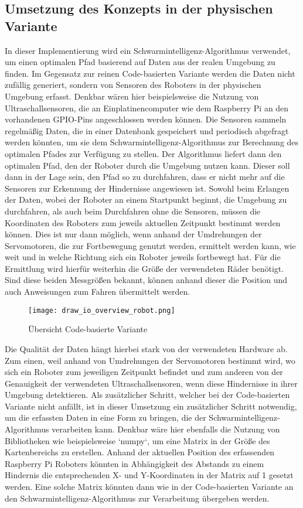 \subsection{Umsetzung des Konzepts in der physischen Variante}
In dieser Implementierung wird ein Schwarmintelligenz-Algorithmus verwendet, um einen optimalen Pfad basierend auf Daten aus der realen Umgebung zu finden. Im Gegensatz zur reinen Code-basierten Variante werden die Daten nicht zufällig generiert, sondern von Sensoren des Roboters in der physischen Umgebung erfasst. Denkbar wären hier beispielsweise die Nutzung von Ultraschallsensoren, die an Einplatinencomputer wie dem Raspberry Pi an den vorhandenen GPIO-Pins angeschlossen werden können. Die Sensoren sammeln regelmäßig Daten, die in einer Datenbank gespeichert und periodisch abgefragt werden könnten, um sie dem Schwarmintelligenz-Algorithmus zur Berechnung des optimalen Pfades zur Verfügung zu stellen. Der Algorithmus liefert dann den optimalen Pfad, den der Roboter durch die Umgebung nutzen kann. Dieser soll dann in der Lage sein, den Pfad so zu durchfahren, dass er nicht mehr auf die Sensoren zur Erkennung der Hindernisse angewiesen ist. Sowohl beim Erlangen der Daten, wobei der Roboter an einem Startpunkt beginnt, die Umgebung zu durchfahren, als auch beim Durchfahren ohne die Sensoren, müssen die Koordinaten des Roboters zum jeweils aktuellen Zeitpunkt bestimmt werden können. Dies ist nur dann möglich, wenn anhand der Umdrehungen der Servomotoren, die zur Fortbewegung genutzt werden, ermittelt werden kann, wie weit und in welche Richtung sich ein Roboter jeweils fortbewegt hat. Für die Ermittlung wird hierfür weiterhin die Größe der verwendeten Räder benötigt. Sind diese beiden Messgrößen bekannt, können anhand dieser die Position und auch Anweisungen zum Fahren übermittelt werden.
\begin{figure}
    \centering
    \texttt{[image: draw\_io\_overview\_robot.png]}
    \caption{Übersicht Code-basierte Variante}
    \label{fig:Figure_2}
\end{figure}

Die Qualität der Daten hängt hierbei stark von der verwendeten Hardware ab. Zum einen, weil anhand von Umdrehungen der Servomotoren bestimmt wird, wo sich ein Roboter zum jeweiligen Zeitpunkt befindet und zum anderen von der Genauigkeit der verwendeten Ultraschallsensoren, wenn diese Hindernisse in ihrer Umgebung detektieren. Als zusätzlicher Schritt, welcher bei der Code-basierten Variante nicht anfällt, ist in dieser Umsetzung ein zusätzlicher Schritt notwendig, um die erfassten Daten in eine Form zu bringen, die der Schwarmintelligenz-Algorithmus verarbeiten kann. Denkbar wäre hier ebenfalls die Nutzung von Bibliotheken wie beispielsweise `numpy`, um eine Matrix in der Größe des Kartenbereichs zu erstellen. Anhand der aktuellen Position des erfassenden Raspberry Pi Roboters könnten in Abhängigkeit des Abstands zu einem Hindernis die entsprechenden X- und Y-Koordinaten in der Matrix auf 1 gesetzt werden. Eine solche Matrix könnten dann wie in der Code-basierten Variante an den Schwarmintelligenz-Algorithmus zur Verarbeitung übergeben werden.

